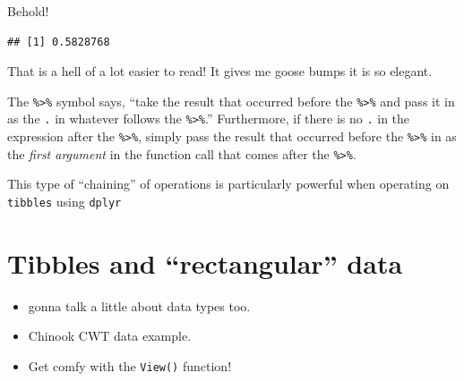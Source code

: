 \documentclass[]{book}
\newenvironment{Shaded}{\begin{snugshade}}{\end{snugshade}}
\newcommand{\KeywordTok}[1]{\textcolor[rgb]{0.13,0.29,0.53}{\textbf{{#1}}}}
\newcommand{\DataTypeTok}[1]{\textcolor[rgb]{0.13,0.29,0.53}{{#1}}}
\newcommand{\DecValTok}[1]{\textcolor[rgb]{0.00,0.00,0.81}{{#1}}}
\newcommand{\StringTok}[1]{\textcolor[rgb]{0.31,0.60,0.02}{{#1}}}
\newcommand{\CommentTok}[1]{\textcolor[rgb]{0.56,0.35,0.01}{\textit{{#1}}}}
\newcommand{\NormalTok}[1]{{#1}}
\providecommand{\tightlist}{%
  \setlength{\itemsep}{0pt}\setlength{\parskip}{0pt}}
\theoremstyle{definition}
\theoremstyle{definition}
\theoremstyle{remark}
\begin{document}
Behold!

\begin{Shaded}
\end{Shaded}

\begin{verbatim}
## [1] 0.5828768
\end{verbatim}

That is a hell of a lot easier to read! It gives me goose bumps it is so
elegant.

The \texttt{\%\textgreater{}\%} symbol says, ``take the result that
occurred before the \texttt{\%\textgreater{}\%} and pass it in as the
\texttt{.} in whatever follows the \texttt{\%\textgreater{}\%}.''
Furthermore, if there is no \texttt{.} in the expression after the
\texttt{\%\textgreater{}\%}, simply pass the result that occurred before
the \texttt{\%\textgreater{}\%} in as the \emph{first argument} in the
function call that comes after the \texttt{\%\textgreater{}\%}.

This type of ``chaining'' of operations is particularly powerful when
operating on \texttt{tibbles} using \texttt{dplyr}

\section{\texorpdfstring{Tibbles and ``rectangular''
data}{Tibbles and rectangular data}}\label{tibbles-and-rectangular-data}

\begin{itemize}
\tightlist
\item
  gonna talk a little about data types too.
\item
  Chinook CWT data example.
\item
  Get comfy with the \texttt{View()} function!
\end{itemize}
\end{document}
